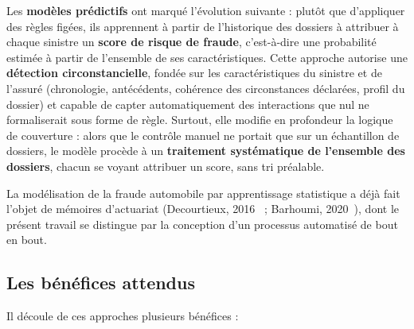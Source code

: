 Les \textbf{modèles prédictifs} ont marqué l'évolution suivante : plutôt que d'appliquer des règles figées, ils apprennent à partir de l'historique des dossiers à attribuer à chaque sinistre un \textbf{score de risque de fraude}, c'est-à-dire une probabilité estimée à partir de l'ensemble de ses caractéristiques. Cette approche autorise une \textbf{détection circonstancielle}, fondée sur les caractéristiques du sinistre et de l'assuré (chronologie, antécédents, cohérence des circonstances déclarées, profil du dossier) et capable de capter automatiquement des interactions que nul ne formaliserait sous forme de règle. Surtout, elle modifie en profondeur la logique de couverture : alors que le contrôle manuel ne portait que sur un échantillon de dossiers, le modèle procède à un \textbf{traitement systématique de l'ensemble des dossiers}, chacun se voyant attribuer un score, sans tri préalable.

La modélisation de la fraude automobile par apprentissage statistique a déjà fait l'objet de mémoires d'actuariat (Decourtieux, 2016~\cite{decourtieux_2016} ; Barhoumi, 2020~\cite{barhoumi_2020}), dont le présent travail se distingue par la conception d'un processus automatisé de bout en bout.

\clearpage

\subsection{Les bénéfices attendus}

Il découle de ces approches plusieurs bénéfices :

